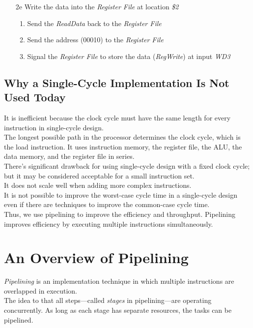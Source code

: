 \documentclass[12pt]{article}
\theoremstyle{definition}
\begin{document}
\begin{enumerate}
\begin{enumerate}
    \end{enumerate}
    \item[2e] Write the data into the \emph{Register File} at location \emph{\$2}
    \begin{enumerate}
      \item Send the \emph{ReadData} back to the \emph{Register File}
      \item Send the address (00010) to the \emph{Register File}
      \item Signal the \emph{Register File} to store the data (\emph{RegWrite}) at input \emph{WD3}
    \end{enumerate}
  \end{enumerate}

  \subsection{Why a Single-Cycle Implementation Is Not Used Today}
  It is inefficient because the clock cycle must have the same length for every instruction in single-cycle design. \\
  The longest possible path in the processor determines the clock cycle, which is the load instruction.
  It uses instruction memory, the register file, the ALU, the data memory, and the register file in series. \\

  There's significant drawback for using single-cycle design with a fixed clock cycle; but it may be considered acceptable for a small instruction set. \\
  It does not scale well when adding more complex instructions. \\
  It is not possible to improve the worst-case cycle time in a single-cycle design even if there are techniques to improve the common-case cycle time. \\

  Thus, we use pipelining to improve the efficiency and throughput.
  Pipelining improves efficiency by executing multiple instructions simultaneously.

  \newpage
  \section{An Overview of Pipelining}
  \emph{Pipelining} is an implementation technique in which multiple instructions are overlapped in execution. \\
  The idea to that all steps---called \emph{stages} in pipelining---are operating concurrently.
  As long as each stage has separate resources, the tasks can be pipelined. \\
\end{document}
